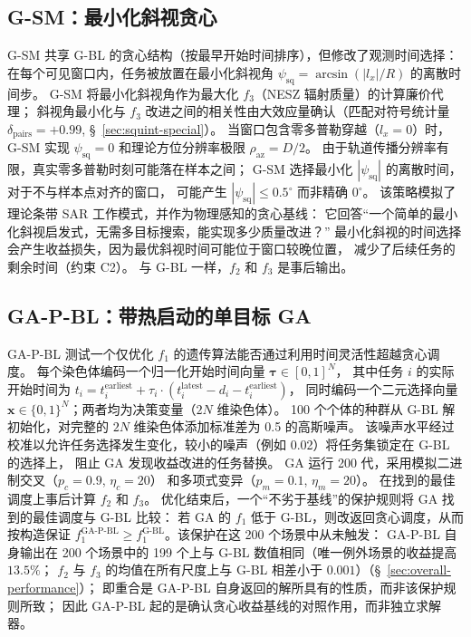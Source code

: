 \documentclass[preprint,12pt,authoryear]{elsarticle}
\begin{document}
\subsection{G-SM：最小化斜视贪心}
G-SM 共享 G-BL 的贪心结构（按最早开始时间排序），但修改了观测时间选择：
在每个可见窗口内，任务被放置在最小化斜视角 $\psi_{\text{sq}} = \arcsin(|l_x| / R)$ 的离散时间步。
G-SM 将最小化斜视角作为最大化 $f_3$（NESZ 辐射质量）的计算廉价代理；
斜视角最小化与 $f_3$ 改进之间的相关性由大效应量确认（匹配对符号统计量 $\delta_{\text{pairs}} = +0.99$, \S~\ref{sec:squint-special}）。
当窗口包含零多普勒穿越（$l_x = 0$）时，G-SM 实现 $\psi_{\text{sq}} = 0$ 和理论方位分辨率极限 $\rho_{\text{az}} = D/2$。
由于轨道传播分辨率有限，真实零多普勒时刻可能落在样本之间；
G-SM 选择最小化 $|\psi_{\text{sq}}|$ 的离散时间，对于不与样本点对齐的窗口，
可能产生 $|\psi_{\text{sq}}| \leq 0.5^\circ$ 而非精确 $0^\circ$。
该策略模拟了理论条带 SAR 工作模式，并作为物理感知的贪心基线：
它回答“一个简单的最小化斜视启发式，无需多目标搜索，能实现多少质量改进？”
最小化斜视的时间选择会产生收益损失，因为最优斜视时间可能位于窗口较晚位置，
减少了后续任务的剩余时间（约束 C2）。
与 G-BL 一样，$f_2$ 和 $f_3$ 是事后输出。
\subsection{GA-P-BL：带热启动的单目标 GA}
\label{sec:ga-p-bl}
GA-P-BL 测试一个仅优化 $f_1$ 的遗传算法能否通过利用时间灵活性超越贪心调度。
每个染色体编码一个归一化开始时间向量 $\boldsymbol{\tau} \in [0,1]^N$，
其中任务 $i$ 的实际开始时间为 $t_i = t_i^{\text{earliest}} + \tau_i \cdot (t_i^{\text{latest}} - d_i - t_i^{\text{earliest}})$，
同时编码一个二元选择向量 $\mathbf{x} \in \{0,1\}^N$；两者均为决策变量（$2N$ 维染色体）。
100 个个体的种群从 G-BL 解初始化，对完整的 $2N$ 维染色体添加标准差为 0.5 的高斯噪声。
该噪声水平经过校准以允许任务选择发生变化，较小的噪声（例如 0.02）将任务集锁定在 G-BL 的选择上，
阻止 GA 发现收益改进的任务替换。
GA 运行 200 代，采用模拟二进制交叉（$p_c = 0.9$, $\eta_c = 20$）
和多项式变异（$p_m = 0.1$, $\eta_m = 20$）。
在找到的最佳调度上事后计算 $f_2$ 和 $f_3$。
优化结束后，一个“不劣于基线”的保护规则将 GA 找到的最佳调度与 G-BL 比较：
若 GA 的 $f_1$ 低于 G-BL，则改返回贪心调度，从而按构造保证
$f_1^{\text{GA-P-BL}} \ge f_1^{\text{G-BL}}$。该保护在这 200 个场景中从未触发：
GA-P-BL 自身输出在 200 个场景中的 199 个上与 G-BL 数值相同（唯一例外场景的收益提高 $13.5\%$；
$f_2$ 与 $f_3$ 的均值在所有尺度上与 G-BL 相差小于 $0.001$）（\S~\ref{sec:overall-performance}）；
即重合是 GA-P-BL 自身返回的解所具有的性质，而非该保护规则所致；
因此 GA-P-BL 起的是确认贪心收益基线的对照作用，而非独立求解器。
\end{document}
